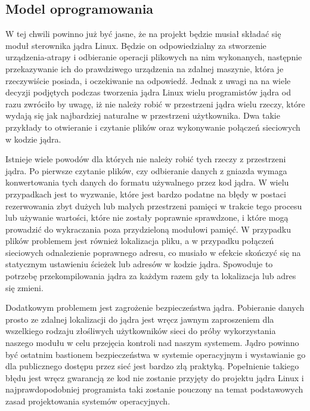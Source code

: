 \documentclass[11pt]{scrartcl}
\begin{document}
\subsection{Model oprogramowania}
\label{softmodel}

W tej chwili powinno już być jasne, że na projekt będzie musiał składać się moduł sterownika jądra Linux. Będzie on odpowiedzialny za stworzenie urządzenia-atrapy i odbieranie operacji plikowych na nim wykonanych, następnie przekazywanie ich do prawdziwego urządzenia na zdalnej maszynie, która je rzeczywiście posiada, i oczekiwanie na odpowiedź. Jednak z uwagi na na wiele decyzji podjętych podczas tworzenia jądra Linux wielu programistów jądra od razu zwróciło by uwagę, iż nie należy robić w przestrzeni jądra wielu rzeczy, które wydają się jak najbardziej naturalne w przestrzeni użytkownika. Dwa takie przykłady to otwieranie i czytanie plików oraz wykonywanie połączeń sieciowych w kodzie jądra.

Istnieje wiele powodów dla których nie należy robić tych rzeczy z przestrzeni jądra. Po pierwsze czytanie plików, czy odbieranie danych z gniazda wymaga konwertowania tych danych do formatu używalnego przez kod jądra. W wielu przypadkach jest to wyzwanie, które jest bardzo podatne na błędy w postaci rezerwowania zbyt dużych lub małych przestrzeni pamięci w trakcie tego procesu lub używanie wartości, które nie zostały poprawnie sprawdzone, i które mogą prowadzić do wykraczania poza przydzieloną modułowi pamięć. W przypadku plików problemem jest również lokalizacja pliku, a w przypadku połączeń sieciowych odnalezienie poprawnego adresu, co musiało w efekcie skończyć się na statycznym ustawieniu ścieżek lub adresów w kodzie jądra. Spowoduje to potrzebę przekompilowania jądra za każdym razem gdy ta lokalizacja lub adres się zmieni.

Dodatkowym problemem jest zagrożenie bezpieczeństwa jądra. Pobieranie danych prosto ze zdalnej lokalizacji do jądra jest wręcz jawnym zaproszeniem dla wszelkiego rodzaju złośliwych użytkowników sieci do próby wykorzystania naszego modułu w celu przejęcia kontroli nad naszym systemem. Jądro powinno być ostatnim bastionem bezpieczeństwa w systemie operacyjnym i wystawianie go dla publicznego dostępu przez sieć jest bardzo złą praktyką. Popełnienie takiego błędu jest wręcz gwarancją ze kod nie zostanie przyjęty do projektu jądra Linux i najprawdopodobniej programista taki zostanie pouczony na temat podstawowych zasad projektowania systemów operacyjnych.
\end{document}

